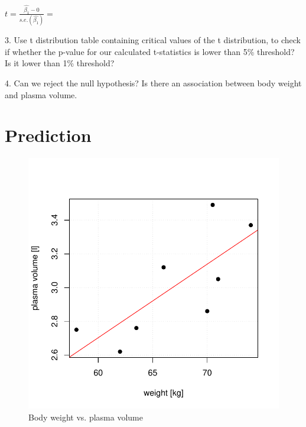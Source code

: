 \documentclass[12pt]{article}\usepackage[]{graphicx}\usepackage[]{color}
\makeatletter
\def\maxwidth{ %
  \ifdim\Gin@nat@width>\linewidth
    \linewidth
  \else
    \Gin@nat@width
  \fi
}
\newenvironment{knitrout}{}{} %
\makeatother
\begin{document}
$t=\frac{\hat{\beta_1}-0}{s.e.(\hat{\beta_1})} = $
\vspace{0.2cm}

3. Use t distribution table containing critical values of the t distribution, to check if whether the p-value for our calculated t-statistics is lower than 5\% threshold? Is it lower than 1\% threshold?

4. Can we reject the null hypothesis? Is there an association between body weight and plasma volume. 

\newpage
\section{Prediction}

\begin{knitrout}
\color{fgcolor}\begin{figure}[H]

{\centering \includegraphics[width=\maxwidth]{figure/fig-prediction-1} 

}

\caption[Body weight vs]{Body weight vs. plasma volume}\label{fig:fig-prediction}
\end{figure}


\end{knitrout}
\end{document}
